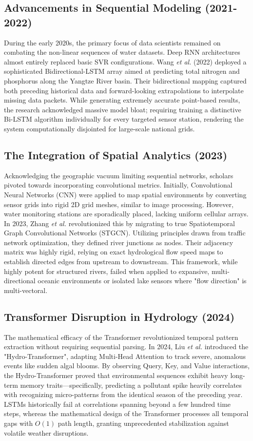 \documentclass[journal,10pt,twocolumn]{IEEEtran}
\begin{document}
\subsection{Advancements in Sequential Modeling (2021-2022)}
During the early 2020s, the primary focus of data scientists remained on combating the non-linear sequences of water datasets. Deep RNN architectures almost entirely replaced basic SVR configurations. Wang \textit{et al.} (2022) deployed a sophisticated Bidirectional-LSTM array aimed at predicting total nitrogen and phosphorus along the Yangtze River basin. Their bidirectional mapping captured both preceding historical data and forward-looking extrapolations to interpolate missing data packets. While generating extremely accurate point-based results, the research acknowledged massive model bloat; requiring training a distinctive Bi-LSTM algorithm individually for every targeted sensor station, rendering the system computationally disjointed for large-scale national grids.

\subsection{The Integration of Spatial Analytics (2023)}
Acknowledging the geographic vacuum limiting sequential networks, scholars pivoted towards incorporating convolutional metrics. Initially, Convolutional Neural Networks (CNN) were applied to map spatial environments by converting sensor grids into rigid 2D grid meshes, similar to image processing. However, water monitoring stations are sporadically placed, lacking uniform cellular arrays. 
In 2023, Zhang \textit{et al.} revolutionized this by migrating to true Spatiotemporal Graph Convolutional Networks (STGCN). Utilizing principles drawn from traffic network optimization, they defined river junctions as nodes. Their adjacency matrix was highly rigid, relying on exact hydrological flow speed maps to establish directed edges from upstream to downstream. This framework, while highly potent for structured rivers, failed when applied to expansive, multi-directional oceanic environments or isolated lake sensors where "flow direction" is multi-vectoral.

\subsection{Transformer Disruption in Hydrology (2024)}
The mathematical efficacy of the Transformer revolutionized temporal pattern extraction without requiring sequential parsing. In 2024, Liu \textit{et al.} introduced the "Hydro-Transformer", adapting Multi-Head Attention to track severe, anomalous events like sudden algal blooms. By observing Query, Key, and Value interactions, the Hydro-Transformer proved that environmental sequences exhibit heavy long-term memory traits—specifically, predicting a pollutant spike heavily correlates with recognizing micro-patterns from the identical season of the preceding year. LSTMs historically fail at correlations spanning beyond a few hundred time steps, whereas the mathematical design of the Transformer processes all temporal gaps with $O(1)$ path length, granting unprecedented stabilization against volatile weather disruptions.
\end{document}

